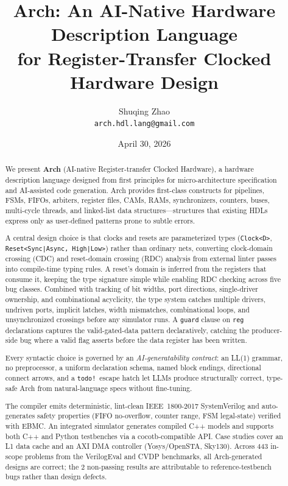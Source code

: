\documentclass[11pt,twocolumn]{article}
\title{\textbf{Arch: An AI-Native Hardware Description Language\\for Register-Transfer Clocked Hardware Design}}
\author{
  Shuqing Zhao \\
  \texttt{arch.hdl.lang@gmail.com}
}
\date{April 30, 2026}
\begin{document}
\maketitle

\begin{abstract}
We present \textbf{Arch} (AI-native Register-transfer Clocked Hardware), a hardware description language designed from first principles for micro-architecture specification and AI-assisted code generation. Arch provides first-class constructs for pipelines, FSMs, FIFOs, arbiters, register files, CAMs, RAMs, synchronizers, counters, buses, multi-cycle threads, and linked-list data structures---structures that existing HDLs express only as user-defined patterns prone to subtle errors.

A central design choice is that clocks and resets are parameterized types (\texttt{Clock<D>}, \texttt{Reset<Sync|Async, High|Low>}) rather than ordinary nets, converting clock-domain crossing (CDC) and reset-domain crossing (RDC) analysis from external linter passes into compile-time typing rules. A reset's domain is inferred from the registers that consume it, keeping the type signature simple while enabling RDC checking across five bug classes. Combined with tracking of bit widths, port directions, single-driver ownership, and combinational acyclicity, the type system catches multiple drivers, undriven ports, implicit latches, width mismatches, combinational loops, and unsynchronized crossings before any simulator runs. A \texttt{guard} clause on \texttt{reg} declarations captures the valid-gated-data pattern declaratively, catching the producer-side bug where a valid flag asserts before the data register has been written.

Every syntactic choice is governed by an \emph{AI-generatability contract}: an LL(1) grammar, no preprocessor, a uniform declaration schema, named block endings, directional connect arrows, and a \texttt{todo!}\ escape hatch let LLMs produce structurally correct, type-safe Arch from natural-language specs without fine-tuning.

The compiler emits deterministic, lint-clean IEEE~1800-2017 SystemVerilog and auto-generates safety properties (FIFO no-overflow, counter range, FSM legal-state) verified with EBMC. An integrated simulator generates compiled C++ models and supports both C++ and Python testbenches via a cocotb-compatible API. Case studies cover an L1 data cache and an AXI DMA controller (Yosys/OpenSTA, Sky130). Across 443 in-scope problems from the VerilogEval and CVDP benchmarks, all Arch-generated designs are correct; the 2 non-passing results are attributable to reference-testbench bugs rather than design defects.
\end{abstract}
\end{document}
